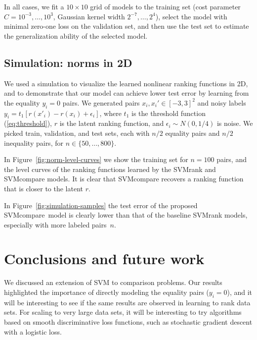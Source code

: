 \documentclass{article}
\newcommand{\SVMcompare}{SVMcompare}
\begin{document}
In all cases, we fit a $10\times 10$ grid of models to the training
set (cost parameter $C=10^{-3},\dots,10^3$, Gaussian kernel width
$2^{-7},\dots,2^4$), select the model with minimal zero-one loss on
the validation set, and then use the test set to estimate the
generalization ability of the selected model.

\subsection{Simulation: norms in 2D}
We used a simulation to visualize the learned nonlinear ranking
functions in 2D, and to demonstrate that our model can achieve
lower test error by learning from the equality $y_i=0$ pairs.
We generated pairs
$x_i,x_i'\in[-3,3]^2$ and noisy labels
$y_i=t_1[r(x'_i)-r(x_i)+\epsilon_i]$, where $t_1$ is the threshold
function (\ref{eq:threshold}), $r$ is the latent ranking function, and
$\epsilon_i\sim N(0, 1/4)$ is noise. We picked train, validation, and
test sets, each with $n/2$ equality pairs and $n/2$ inequality pairs,
for $n\in\{50,\dots,800\}$. 

In Figure~\ref{fig:norm-level-curves} we show the training set for
$n=100$ pairs, and the level curves of the ranking functions learned
by the SVMrank and SVMcompare models. It is clear that SVMcompare
recovers a ranking function that is closer to the latent $r$.

In Figure~\ref{fig:simulation-samples} the test error of the proposed
\SVMcompare\ model is clearly lower than that of the baseline SVMrank
models, especially with more labeled pairs~$n$. 


\section{Conclusions and future work}
\label{sec:conclusions}

We discussed an extension of SVM to comparison problems. Our results
highlighted the importance of directly modeling the equality pairs
($y_i=0$), and it will be interesting to see if the same results are
observed in learning to rank data sets. For scaling to very large data
sets, it will be interesting to try algorithms based on smooth
discriminative loss functions, such as stochastic gradient descent
with a logistic loss.
\end{document}
